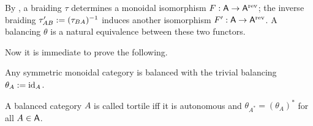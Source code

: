 By , a braiding $\tau$ determines a monoidal isomorphism
$F: \mathsf{A} \to \mathsf{A}\sp{\text{rev}}$; the inverse braiding $\tau'_{AB} := (\tau_{BA})\sp{-1}$
induces another isomorphism $F': \mathsf{A} \to \mathsf{A}\sp{\text{rev}}$. A balancing $\theta$ is a
natural equivalence between these two functors.

Now it is immediate to prove the following.
\begin{proposition}
  Any symmetric monoidal category is balanced with the trivial
  balancing $\theta_A := \operatorname{id}_A$.
\end{proposition}

\begin{definition}
  A balanced category $A$ is called tortile iff it is autonomous and
    $\theta_{A^*} = (\theta_A)^*$ for all $A\in\mathsf{A}$.
\end{definition}




